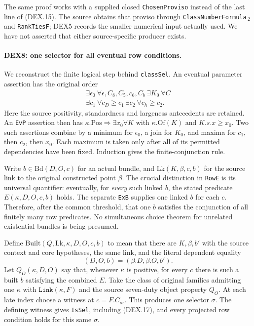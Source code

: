 \documentclass[11pt,a4paper]{article}
\numberwithin{equation}{section}
\theoremstyle{remark}\newtheorem{remark}[theorem]{Remark}
\begin{document}
The same proof works with a supplied closed \texttt{ChosenProviso}
instead of the last line of (DEX.15). The source obtains that proviso
through \texttt{ClassNumberFormula}$\,{}_2$ and
\texttt{RankTiesF}; DEX5 records the smaller numerical input actually
used. We have not asserted that either source-specific producer exists.

\paragraph{DEX8: one selector for all eventual row conditions.}
\label{claim:DEX8}
We reconstruct the finite logical step behind \texttt{classSel}.
An eventual parameter assertion has the original order
\[
 \begin{gathered}
 \exists\epsilon_0\ \forall\epsilon,C_8,C_5,c_6,C_b\
 \exists K_0\ \forall C\\
 \exists c_1\ \forall c_D\ge c_1\
 \exists c_2\ \forall c_h\ge c_2 .
 \end{gathered}                                           \tag{DEX.16}
\]
Here the source positivity, standardness and largeness antecedents
are retained. An \texttt{EvP} assertion then has
$\kappa.\mathrm{Pos}\Rightarrow\exists x_0\forall K$ with
$\kappa.\mathrm{Of}(K)$ and $K.s.x\ge x_0$.
Two such assertions combine by a minimum for $\epsilon_0$, a join
for $K_0$, and maxima for $c_1$, then $c_2$, then $x_0$.
Each maximum is taken only after all of its permitted dependencies
have been fixed. Induction gives the finite-conjunction rule.

Write $b\in\mathrm{Bd}(D,O,c)$ for an actual bundle, and
$\mathrm{Lk}(K,\beta,c,b)$ for the source link to the original
constructed point $\beta$. The crucial distinction in
\texttt{RowE} is its universal quantifier: eventually, for
\emph{every} such linked $b$, the stated predicate $E(\kappa,D,O,c,b)$
holds. The separate \texttt{ExB} supplies one linked $b$ for each
$c$. Therefore, after the common threshold, that one $b$ satisfies
the conjunction of all finitely many row predicates. No simultaneous
choice theorem for unrelated existential bundles is being presumed.

Define $\mathrm{Built}(Q,\mathrm{Lk},\kappa,D,O,c,b)$ to mean that
there are $K,\beta,b'$ with the source context and core hypotheses,
the same link, and the literal dependent equality
\[
                 (D,O,b)=(\beta.D,\beta.O,b').            \tag{DEX.17}
\]
Let $Q_O(\kappa,D,O)$ say that, whenever $\kappa$ is positive,
for every $c$ there is such a built $b$ satisfying the combined $E$.
Take the class of original families admitting one $\kappa$ with
$\texttt{Link}(\kappa,F)$ and the source seven-duty object property
$Q_O$. At each late index choose a witness at $c=F.C_{sz}$.
This produces one selector $\sigma$. The defining witness gives
\texttt{IsSel}, including (DEX.17), and every projected row condition
holds for this same $\sigma$.
\end{document}
